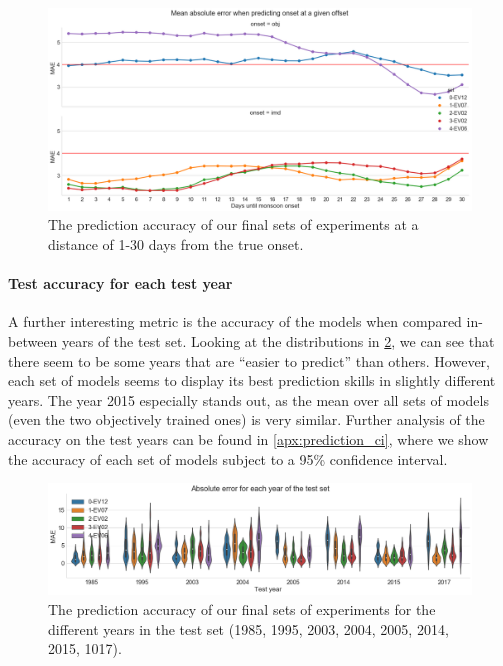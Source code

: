 \begin{figure}[h!]
  \centering
  \includegraphics[width=\linewidth]{./99_appendix/img/prediction_accuracy_offset}
  \caption{The prediction accuracy of our final sets of experiments at a distance of 1-30 days from the true onset.}
  \label{fig:e4_prediction_accuracy_offset}
\end{figure}

\paragraph{Test accuracy for each test year}
A further interesting metric is the accuracy of the models when compared in-between years of the test set. Looking at the distributions in \cref{fig:e4_prediction_years}, we can see that there seem to be some years that are ``easier to predict'' than others. However, each set of models seems to display its best prediction skills in slightly different years. The year 2015 especially stands out, as the mean over all sets of models (even the two objectively trained ones) is very similar. Further analysis of the accuracy on the test years can be found in \cref{apx:prediction_ci}, where we show the accuracy of each set of models subject to a 95\% confidence interval.

\begin{figure}[h!]
  \centering
  \includegraphics[width=\linewidth]{./99_appendix/img/prediction_years}
  \caption{The prediction accuracy of our final sets of experiments for the different years in the test set (1985, 1995, 2003, 2004, 2005, 2014, 2015, 1017).}
  \label{fig:e4_prediction_years}
\end{figure}

